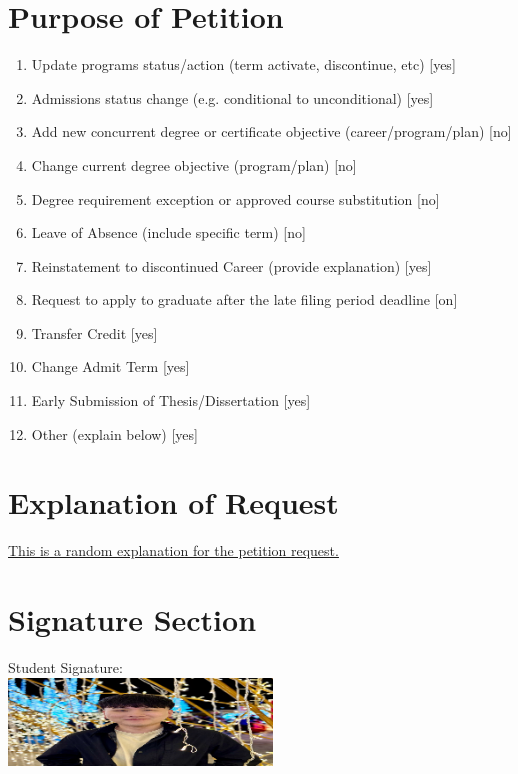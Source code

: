 \documentclass[a4paper,12pt]{article}
\begin{document}
    \section*{Purpose of Petition}
    \begin{enumerate}
        \item Update programs status/action (term activate, discontinue, etc) \hfill [yes]
        \item Admissions status change (e.g. conditional to unconditional) \hfill [yes]
        \item Add new concurrent degree or certificate objective (career/program/plan) \hfill [no]
        \item Change current degree objective (program/plan) \hfill [no]
        \item Degree requirement exception or approved course substitution \hfill [no]
        \item Leave of Absence (include specific term) \hfill [no]
        \item Reinstatement to discontinued Career (provide explanation) \hfill [yes]
        \item Request to apply to graduate after the late filing period deadline \hfill [on]
        \item Transfer Credit \hfill [yes]
        \item Change Admit Term \hfill [yes]
        \item Early Submission of Thesis/Dissertation \hfill [yes]
        \item Other (explain below) \hfill [yes]
    \end{enumerate}
    
    \section*{Explanation of Request}
    \begin{flushleft}
    \underline{\hspace{15cm} This is a random explanation for the petition request.} \\
    \end{flushleft}
    
    \section*{Signature Section}
    Student Signature: \\
    \includegraphics[width=7cm]{signature.png}
    
    
\end{document}
